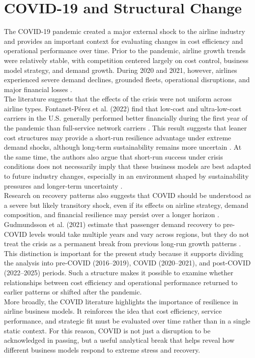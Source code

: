 \documentclass[11pt, letterpaper]{article}
\begin{document}
\section{COVID-19 and Structural Change}
The COVID-19 pandemic created a major external shock to the airline industry and provides an important context for evaluating changes in cost efficiency and operational performance over time. Prior to the pandemic, airline growth trends were relatively stable, with competition centered largely on cost control, business model strategy, and demand growth. During 2020 and 2021, however, airlines experienced severe demand declines, grounded fleets, operational disruptions, and major financial losses \cite{FontanetPerez2022,Gudmundsson2021}.\\
\indent The literature suggests that the effects of the crisis were not uniform across airline types. Fontanet-P\'erez et al. (2022) find that low-cost and ultra-low-cost carriers in the U.S. generally performed better financially during the first year of the pandemic than full-service network carriers \cite{FontanetPerez2022}. This result suggests that leaner cost structures may provide a short-run resilience advantage under extreme demand shocks, although long-term sustainability remains more uncertain \cite{FontanetPerez2022,Gudmundsson2023}. At the same time, the authors also argue that short-run success under crisis conditions does not necessarily imply that these business models are best adapted to future industry changes, especially in an environment shaped by sustainability pressures and longer-term uncertainty \cite{FontanetPerez2022}.\\
\indent Research on recovery patterns also suggests that COVID should be understood as a severe but likely transitory shock, even if its effects on airline strategy, demand composition, and financial resilience may persist over a longer horizon \cite{FontanetPerez2022,Gudmundsson2021}. Gudmundsson et al. (2021) estimate that passenger demand recovery to pre-COVID levels would take multiple years and vary across regions, but they do not treat the crisis as a permanent break from previous long-run growth patterns \cite{Gudmundsson2021}. This distinction is important for the present study because it supports dividing the analysis into pre-COVID (2016--2019), COVID (2020--2021), and post-COVID (2022--2025) periods. Such a structure makes it possible to examine whether relationships between cost efficiency and operational performance returned to earlier patterns or shifted after the pandemic.\\
\indent More broadly, the COVID literature highlights the importance of resilience in airline business models. It reinforces the idea that cost efficiency, service performance, and strategic fit must be evaluated over time rather than in a single static context. For this reason, COVID is not just a disruption to be acknowledged in passing, but a useful analytical break that helps reveal how different business models respond to extreme stress and recovery.
\end{document}

